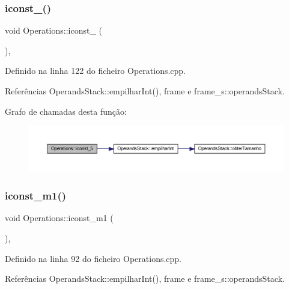 \subsubsection{\texorpdfstring{iconst\+\_()}{iconst\_5()}}
{\footnotesize\ttfamily void Operations\+::iconst\+\_ (\begin{DoxyParamCaption}{ }\end{DoxyParamCaption})\hspace{0.3cm}{\ttfamily [static]}, {\ttfamily [private]}}



Definido na linha 122 do ficheiro Operations.\+cpp.



Referências Operands\+Stack\+::empilhar\+Int(), frame e frame\+\_\+s\+::operands\+Stack.

Grafo de chamadas desta função\+:
\nopagebreak
\begin{figure}[H]
\begin{center}
\leavevmode
\includegraphics[width=350pt]{classOperations_a87a4c7214825d084ded4a8ea50e4af7c_cgraph}
\end{center}
\end{figure}
\mbox{\label{classOperations_abb57552d42047d4b685b2d68db6b1fd7}} 
\subsubsection{\texorpdfstring{iconst\+\_\+m1()}{iconst\_m1()}}
{\footnotesize\ttfamily void Operations\+::iconst\+\_\+m1 (\begin{DoxyParamCaption}{ }\end{DoxyParamCaption})\hspace{0.3cm}{\ttfamily [static]}, {\ttfamily [private]}}



Definido na linha 92 do ficheiro Operations.\+cpp.



Referências Operands\+Stack\+::empilhar\+Int(), frame e frame\+\_\+s\+::operands\+Stack.

